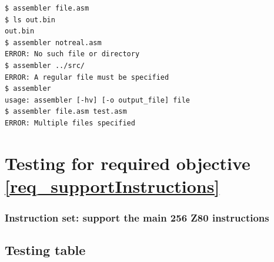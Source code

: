 \documentclass[a4paper]{report}
\begin{document}
\begin{lstlisting}
$ assembler file.asm
$ ls out.bin
out.bin
$ assembler notreal.asm
ERROR: No such file or directory
$ assembler ../src/
ERROR: A regular file must be specified
$ assembler
usage: assembler [-hv] [-o output_file] file
$ assembler file.asm test.asm
ERROR: Multiple files specified
\end{lstlisting}





\section{Testing for required objective \ref{req_supportInstructions}}

\subsubsection{Instruction set: support the main 256 Z80 instructions}

\subsection{Testing table}
\end{document}
